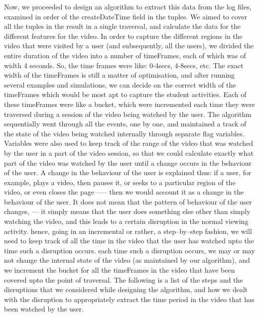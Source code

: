 \documentclass[16pt]{report}
\begin{document}
Now, we proceeded to design an algorithm to extract this data from the log files, examined in order of the createDateTime field in the tuples. We aimed to cover all the tuples in the result in a single traversal, and calculate the data for the different features for the video. In order to capture the different regions in the video that were visited by a user (and subsequently, all the users), we divided the entire duration of the video into a number of timeFrames, each of which was of width 4 seconds. So, the time frames were like: 0-4secs, 4-8secs, etc. The exact width of the timeFrames is still a matter of optimisation, and after running several examples and simulations, we can decide on the correct width of the timeFrames which would be most apt to capture the student activities. Each of these timeFrames were like a bucket, which were incremented each time they were traversed during a session of the video being watched by the user. The algorithm sequentially went through all the events, one by one, and maintained a track of the state of the video being watched internally through separate flag variables. Variables were also used to keep track of the range of the video that was watched by the user in a part of the video session, so that we could calculate exactly what part of the video was watched by the user until a change occurs in the behaviour of the user. A change in the behaviour of the user is explained thus: if a user, for example, plays a video, then pauses it, or seeks to a particular region of the video, or even closes the page ----- then we would account it as a change in the behaviour of the user. It does not mean that the pattern of behaviour of the user changes, --- it simply means that the user does something else other than simply watching the video, and this leads to a certain disruption in the normal viewing activity. hence, going in an incremental or rather, a step--by--step fashion, we will need to keep track of all the time in the video that the user has watched upto the time such a disruption occurs. each time such a disruption occurs, we may or may not change the internal state of the video (as maintained by our algorithm), and we increment the bucket for all the timeFrames in the video that have been covered upto the point of traversal. The following is a list of the steps and the disruptions that we considered while designing the algorithm, and how we dealt with the disruption to appropriately extract the time period in the video that has been watched by the user.
\end{document}
